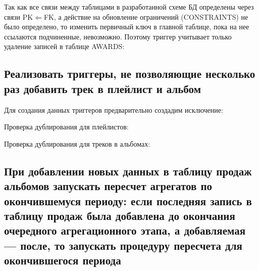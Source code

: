 Так как все связи между таблицами в разработанной схеме БД определены через связи PK$\Leftarrow$FK, а действие на обновление ограничений (CONSTRAINTS) не было определено, то изменить первичный ключ в главной таблице, пока на нее ссылаются подчиненные, невозможно. Поэтому триггер учитывает только удаление записей в таблице AWARDS:



\subsection{Реализовать триггеры, не позволяющие несколько раз добавить трек в плейлист и альбом}

Для создания данных триггеров предварительно создадим исключение:



Проверка дублирования для плейлистов:



Проверка дублирования для треков в альбомах:



\subsection{При добавлении новых данных в таблицу продаж альбомов запускать пересчет агрегатов по окончившемуся периоду: если последняя запись в таблицу продаж была добавлена до окончания очередного агрегационного этапа, а добавляемая --- после, то запускать процедуру пересчета для окончившегося периода}

